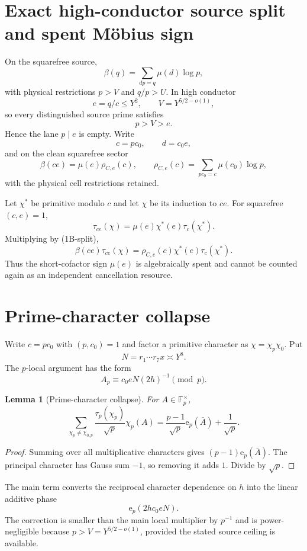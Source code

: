 \documentclass[11pt]{article}
\newtheorem{lemma}[theorem]{Lemma}
\theoremstyle{definition}
\theoremstyle{remark}
\newcommand{\e}{\mathrm{e}}
\newcommand{\1}{\mathbf 1}
\begin{document}
\section{Exact high-conductor source split and spent M\"obius sign}

On the squarefree source,
\[
 \beta(q)=\sum_{dp=q}\mu(d)\log p,
\]
with physical restrictions $p>V$ and $q/p>U$.  In high conductor
\[
 e=q/c\le Y^2,
 \qquad V=Y^{5/2-o(1)},
\]
so every distinguished source prime satisfies
\[
 p>V>e.
\]
Hence the lane $p\mid e$ is empty.  Write
\[
 c=pc_0,
 \qquad d=c_0e,
\]
and on the clean squarefree sector
\[
 \boxed{\beta(ce)=\mu(e)\rho_{C,e}(c),
 \qquad
 \rho_{C,e}(c)=\sum_{pc_0=c}\mu(c_0)\log p,}
\tag{1B-split}
\]
with the physical cell restrictions retained.

Let $\chi^*$ be primitive modulo $c$ and let $\chi$ be its induction to $ce$.  For squarefree $(c,e)=1$,
\[
 \tau_{ce}(\chi)=\mu(e)\chi^*(e)\tau_c(\chi^*).
\tag{1B-Gauss}
\]
Multiplying by (1B-split),
\[
 \boxed{\beta(ce)\tau_{ce}(\chi)
 =\rho_{C,e}(c)\chi^*(e)\tau_c(\chi^*).}
\tag{1B-spent}
\]
Thus the short-cofactor sign $\mu(e)$ is algebraically spent and cannot be counted again as an independent
cancellation resource.

\section{Prime-character collapse}

Write $c=pc_0$ with $(p,c_0)=1$ and factor a primitive character as $\chi=\chi_p\chi_0$.  Put
\[
 N=r_1\cdots r_7x\asymp Y^8.
\]
The $p$-local argument has the form
\[
 A_p\equiv c_0eN(2h)^{-1}\pmod p.
\]

\begin{lemma}[Prime-character collapse]\label{lem:charcollapse}
For $A\in\mathbb F_p^\times$,
\[
 \boxed{
 \sum_{\chi_p\ne\chi_{0,p}}\frac{\tau_p(\chi_p)}{\sqrt p}\chi_p(A)
 =\frac{p-1}{\sqrt p}\e_p(\bar A)+\frac1{\sqrt p}.}
\tag{1B-char}
\]
\end{lemma}
\begin{proof}
Summing over all multiplicative characters gives $(p-1)\e_p(\bar A)$.  The principal character has Gauss sum
$-1$, so removing it adds $1$.  Divide by $\sqrt p$.
\end{proof}

The main term converts the reciprocal character dependence on $h$ into the linear additive phase
\[
 \e_p(2hc_0eN).
\tag{1B-linear}
\]
The correction is smaller than the main local multiplier by $p^{-1}$ and is power-negligible because
$p>V=Y^{5/2-o(1)}$, provided the stated source ceiling is available.
\end{document}
